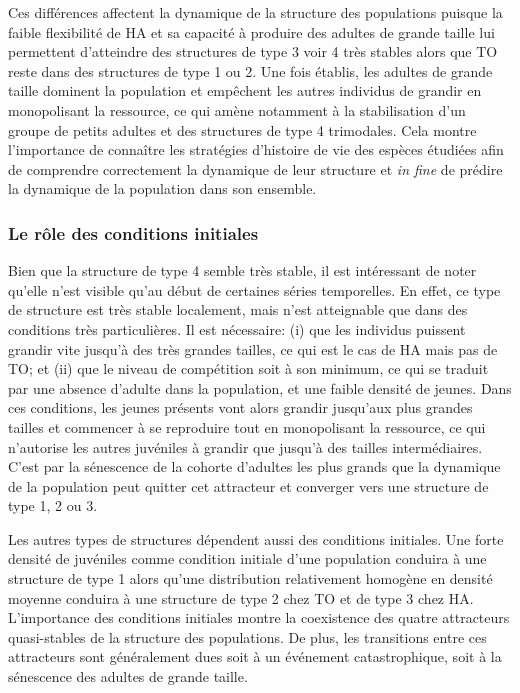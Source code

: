 Ces différences affectent la dynamique de la structure des populations puisque
la faible flexibilité de HA et sa capacité à produire des adultes de grande
taille lui permettent d'atteindre des structures de type 3 voir 4 très
stables alors que TO reste dans des structures de type 1 ou 2. Une
fois établis, les adultes de grande taille dominent la population et empêchent
les autres individus de grandir en monopolisant la ressource, ce qui amène
notamment à la stabilisation d'un groupe de petits adultes et des structures de
type 4 trimodales. Cela montre l'importance de connaître les stratégies
d'histoire de vie des espèces étudiées afin de comprendre correctement la
dynamique de leur structure et \textit{in fine} de prédire la dynamique de la
population dans son ensemble.

\subsubsection{Le rôle des conditions initiales}

Bien que la structure de type 4 semble très stable, il est intéressant de noter
qu'elle n'est visible qu'au début de certaines séries temporelles. En effet, ce
type de structure est très stable localement, mais n'est atteignable que dans
des conditions très particulières. Il est nécessaire: (i) que les individus
puissent grandir vite jusqu'à des très grandes tailles, ce qui est le cas
de HA mais pas de TO; et (ii) que le niveau de compétition soit à son minimum,
ce qui se traduit par une absence d'adulte dans la population, et une faible
densité de jeunes. Dans ces conditions, les jeunes présents vont alors grandir
jusqu'aux plus grandes tailles et commencer à se reproduire tout en monopolisant
la ressource, ce qui n'autorise les autres juvéniles à grandir que jusqu'à des
tailles intermédiaires. C'est par la sénescence de la cohorte d'adultes les plus
grands que la dynamique de la population peut quitter cet attracteur et
converger vers une structure de type 1, 2 ou 3.

Les autres types de structures dépendent aussi des conditions initiales. Une
forte densité de juvéniles comme condition initiale d'une population conduira à
une structure de type 1 alors qu'une distribution relativement homogène en
densité moyenne conduira à une structure de type 2 chez TO et de type 3 chez HA.
L'importance des conditions initiales montre la coexistence des quatre
attracteurs quasi-stables de la structure des populations. De plus, les
transitions entre ces attracteurs sont généralement dues soit à un événement
catastrophique, soit à la sénescence des adultes de grande taille. 

